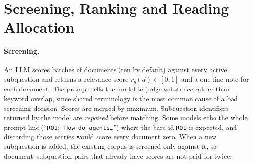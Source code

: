 \documentclass{article}
\newcommand{\code}[1]{\texttt{#1}}
\begin{document}
\section{Screening, Ranking and Reading Allocation}
\label{sec:rank}

\paragraph{Screening.} An LLM scores batches of documents (ten by default)
against every active subquestion and returns a relevance score
$r_q(d)\in[0,1]$ and a one-line note for each document. The prompt tells
the model to judge substance rather than keyword overlap, since shared
terminology is the most common cause of a bad screening decision. Scores
are merged by maximum. Subquestion identifiers returned by the model are
\emph{repaired} before matching. Some models echo the whole prompt line
(``\code{RQ1: How do agents\ldots}'') where the bare id \code{RQ1} is
expected, and discarding those entries would score every document zero.
When a new subquestion is added, the existing corpus is screened only
against it, so document--subquestion pairs that already have scores are
not paid for twice.
\end{document}

